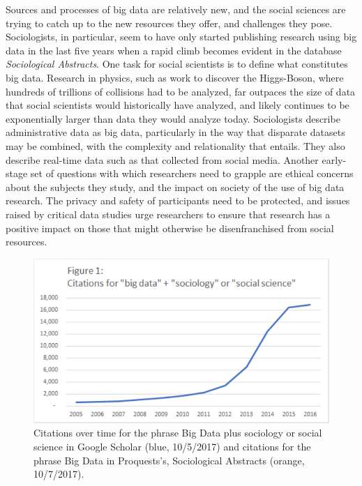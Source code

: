 \documentclass[sigconf]{acmart}
\begin{document}
Sources and processes of big data are relatively new, and the social sciences are trying to catch up to the new resources they offer, and challenges they pose.  Sociologists, in particular, seem to have only started publishing research using big data in the last five years when a rapid climb becomes evident in the database {\em Sociological Abstracts}.  One task for social scientists is to define what constitutes big data.  Research in physics, such as work to discover the Higgs-Boson, where hundreds of trillions of collisions had to be analyzed, far outpaces the size of data that social scientists would historically have analyzed, and likely continues to be exponentially larger than data they would analyze today.  Sociologists describe administrative data as big data, particularly in the way that disparate datasets may be combined, with the complexity and relationality that entails.  They also describe real-time data such as that collected from social media.  Another early-stage set of questions with which researchers need to grapple are ethical concerns about the subjects they study, and the impact on society of the use of big data research.  The privacy and safety of participants need to be protected, and issues raised by critical data studies urge researchers to ensure that research has a positive impact on those that might otherwise be disenfranchised from social resources.



\begin{figure}
\includegraphics[width=\columnwidth]{images/figure1}
\caption{Citations over time for the phrase Big Data plus sociology or social science in Google Scholar (blue, 10/5/2017) and citations for the phrase Big Data in Proquests's, Sociological Abstracts (orange, 10/7/2017).}
\label{f:figure1}
\end{figure}
\end{document}

